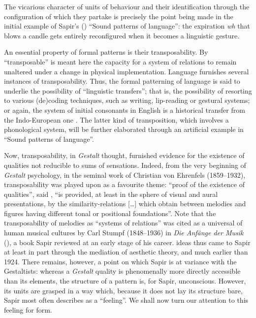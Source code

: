\documentclass[output=paper]{langscibook}
\begin{document}
The vicarious character of units of behaviour and their identification through the configuration of which they partake is precisely the point being made in the initial example of Sapir's (\citeyear{Sapir1925}) ``Sound patterns of language'': the expiration \emph{wh} that blows a candle gets entirely reconfigured when it becomes a linguistic gesture. 

An essential property of formal patterns is their transposability. By ``transposable'' is meant here the capacity for a system of relations to remain unaltered under a change in physical implementation. Language furnishes several instances of transposability. Thus, the formal patterning of language is said to underlie the possibility of ``linguistic transfers''; that is, the possibility of resorting to various (de)coding techniques, such as writing, lip-reading or gestural systems; or again, the system of initial consonants in English is a historical transfer from the Indo-European one \citep[200]{Sapir1921}. The latter kind of transposition, which involves a phonological system, will be further elaborated through an artificial example in ``Sound patterns of language''.

Now, transposability, in \emph{Gestalt} thought, furnished evidence for the existence of qualities not reducible to sums of sensations. Indeed, from the very beginning of \emph{Gestalt} psychology, in the seminal work of Christian von Ehrenfels (1859--1932), transposability was played upon as a favourite theme: ``proof of the existence of  qualities'', said \citet[90]{Ehrenfels1988}, ``is provided, at least in the sphere of visual and aural presentations, by the similarity-relations […] which obtain between melodies and figures having different tonal or positional foundations''. Note that the transposability of melodies as ``systems of relations'' was cited as a universal of human musical cultures by Carl Stumpf (1848--1936) in \emph{Die Anfänge der Musik} (\citeyear{Stumpf1911}), a book Sapir reviewed at an early stage of his career.  ideas thus came to Sapir at least in part through the mediation of aesthetic theory, and much earlier than 1924. There remains, however, a point on which Sapir is at variance with the Gestaltists: whereas a \emph{Gestalt} quality is phenomenally more directly accessible than its elements, the structure of a pattern is, for Sapir, unconscious. However, its units are grasped in a way which, because it does not lay its structure bare, Sapir most often describes as a ``feeling''. We shall now turn our attention to this feeling for form.
\end{document}
